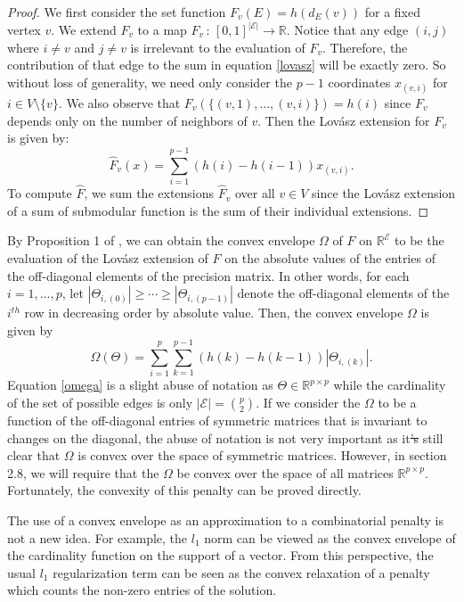 \documentclass{uwstat572}
\newcommand{\vmdel}[1]{\sout{#1}}
\newcommand{\vmadd}[1]{\textbf{\color{red}{#1}}}
\theoremstyle{remark}
\theoremstyle{definition}
\begin{document}
\begin{proof}
We first consider the set function $F_v(E) = h(d_E(v))$ for a fixed vertex $v$. We extend $F_v$ to a map  $\hat{F}_v \, : \, [0,1]^{|\mathcal{E}|} \to \mathbb{R}$.  Notice that any edge $(i,j)$ where $i \neq v$ and $j \neq v$ is irrelevant to the evaluation of $F_v$. Therefore, the contribution of that edge to the sum in equation \eqref{lovasz} will be exactly zero. So without loss of generality, we need only consider the $p-1$ coordinates $x_{(v,i)}$ for $i \in V \setminus \{v\}$.  We also observe that $F_v( \{(v,1),...,(v,i)\}) = h(i)$ since $F_v$ depends only on the number of neighbors of $v$. Then the Lov{\'a}sz extension for $F_v$ is given by:
\begin{equation*}
    \hat{F}_v(x) = \sum_{i = 1}^{p-1} (h(i) - h(i-1)) x_{(v,i)}.
\end{equation*}
To compute $\hat{F}$, we sum the extensions $\hat{F}_v$ over all $v \in V$ since the Lov{\'a}sz extension of a sum of submodular function is the sum of their individual extensions.
\end{proof}


By Proposition 1 of \cite{bach2010}, we can obtain the convex envelope $\Omega$ of $F$ on $\mathbb{R}^{\mathcal{E}}$ to be the evaluation of the Lov{\'a}sz extension of $F$ on the absolute values of the entries of the off-diagonal elements of the precision matrix.  In other words, for each $i = 1,...,p$,  let $|\Theta_{i,(0)}| \geq \cdots \geq |\Theta_{i,(p-1)}|$ denote the off-diagonal elements of the $i^{th}$ row in decreasing order by absolute value.  Then, the convex envelope $\Omega$ is given by
\begin{equation}\label{omega}
\Omega(\Theta) = \sum_{i=1}^p \sum_{k=1}^{p-1} (h(k) - h(k-1)) | \Theta_{i,(k)}|.
\end{equation}
Equation \eqref{omega} is a slight abuse of notation as $\Theta \in \mathbb{R}^{p \times p}$ while the cardinality of the set of possible edges is only $|\mathcal{E}| = \binom{p}{2}$.  If we consider the $\Omega$ to be a function of the off-diagonal entries of symmetric matrices that is invariant to changes on the diagonal, the abuse of notation is not very important as it\vmdel{'s} \vmadd{is} still clear that $\Omega$ is convex over the space of symmetric matrices.  However, in section 2.8, we will require that the $\Omega$ be convex over the space of all matrices $\mathbb{R}^{p \times p}$. Fortunately, the convexity of this penalty can be proved directly.  

The use of a convex envelope as an approximation to a combinatorial penalty is not a new idea.  For example, the $l_1$ norm can be viewed as the convex envelope of the cardinality function on the support of a vector.  From this perspective, the usual $l_1$ regularization term can be seen as the convex relaxation of a penalty which counts the non-zero entries of the solution.
\end{document}
